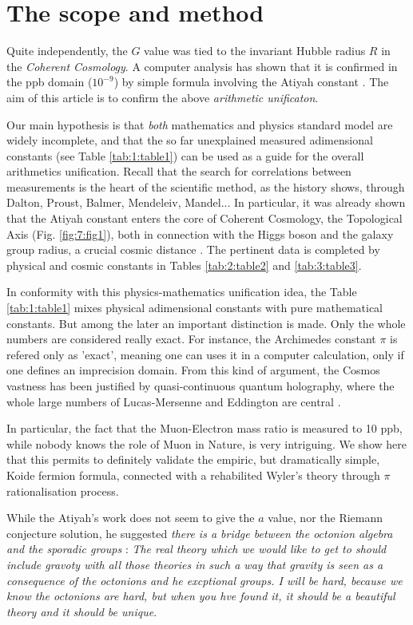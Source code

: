 \documentclass[a4paper,9pt]{article}
\begin{document}
\section{The scope and method}
   Quite independently, the $G$ value was tied to the invariant Hubble radius $R$ in the \textit {Coherent Cosmology}. A computer analysis has shown \cite{LaGuer} that it is confirmed in the ppb domain ($10^{-9}$) by simple formula involving the Atiyah constant \cite{Sanchez}. The aim of this article is to confirm the above \textit {arithmetic unificaton}.
   
   Our main hypothesis is that \textit{both} mathematics and physics standard model are widely incomplete, and that the so far unexplained measured adimensional constants (see Table \ref{tab:1:table1}) can be used as a guide for the overall arithmetics unification. Recall that the search for correlations between measurements is the heart of the scientific method, as the history shows, through Dalton, Proust, Balmer, Mendeleiv, Mandel... In particular, it was already shown that the Atiyah constant enters the core of Coherent Cosmology, the Topological Axis (Fig. \ref{fig:7:fig1}), both in connection with the Higgs boson and the galaxy group radius, a crucial cosmic distance \cite{Sanchez}. The pertinent data is completed by physical and cosmic constants in Tables \ref{tab:2:table2} and \ref{tab:3:table3}.
   
   
   In conformity with this physics-mathematics unification idea, the Table \ref{tab:1:table1} mixes physical adimensional constants \cite{Tanabashi} with pure mathematical constants. But among the later an important distinction is made. Only the whole numbers are considered really exact. For instance, the Archimedes constant $\pi$ is refered only as 'exact', meaning one can uses it in a computer calculation, only if one defines an imprecision domain. From this kind of argument, the Cosmos vastness has been justified by quasi-continuous quantum holography, where the whole large numbers of Lucas-Mersenne \cite{Bastin} and Eddington \cite{Eddington} are central \cite{Sanchez}.
      
      
   In particular, the fact that the Muon-Electron mass ratio is measured to 10 ppb, while nobody knows the role of Muon in Nature, is very intriguing. We show here that this permits to definitely validate the empiric, but dramatically simple, Koide fermion formula, connected with a rehabilited Wyler's theory through $\pi$ rationalisation process. 
   
   
   While the Atiyah's work does not seem to give the $a$ value, nor the Riemann conjecture solution, he suggested \textit{there is a bridge between the octonion algebra and the sporadic groups} \cite{Atiyah1}: \textit {The real theory which we would like to get to should include gravoty with all those theories in such a way that gravity is seen as a consequence of the octonions and he excptional groups. I will be hard, because we know the octonions are hard, but when you hve found it, it should be a beautiful theory and it should be unique}. 
   
\end{document}
